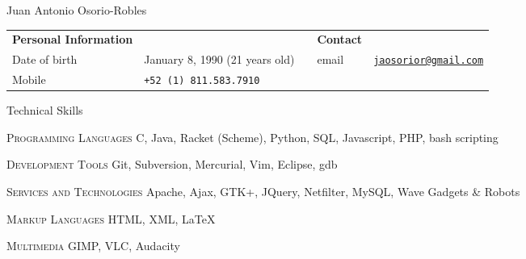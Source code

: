 \documentclass[spanish,10pt,letterpaper]{article}
\begin{document}
\centering
\begin{cv}{Juan Antonio Osorio-Robles}


	\begin{table}[h]
		\begin{tabular}{@{} l l p{0.5cm} l r}
			{\bf Personal Information}	&	&	&	{\bf Contact}	&	\\
			Date of birth &	January 8, 1990 (21 years old)	&	&
			email	&	\href{mailto:jaosorior@gmail.com}	{\tt jaosorior@gmail.com}	\\
			Mobile &	{\tt +52~(1)~811.583.7910}	\\
		\end{tabular}
	\end{table}
	
	\begin{cvlist}{Technical Skills}
			\item [\textsc{Programming Languages}]
				C, Java, Racket (Scheme), Python, SQL, Javascript, PHP, bash scripting
			\item [\textsc{Development Tools}]
				Git, Subversion, Mercurial, Vim, Eclipse, gdb
			\item [\textsc {Services and Technologies}]
				Apache, Ajax, GTK+, JQuery, Netfilter, MySQL, Wave Gadgets \& Robots
			\item [\textsc {Markup Languages}]
				HTML, XML,
				\LaTeX
			\item [\textsc {Multimedia}]
				GIMP, VLC, Audacity
	\end{cvlist}


\end{cv}
\end{document}
